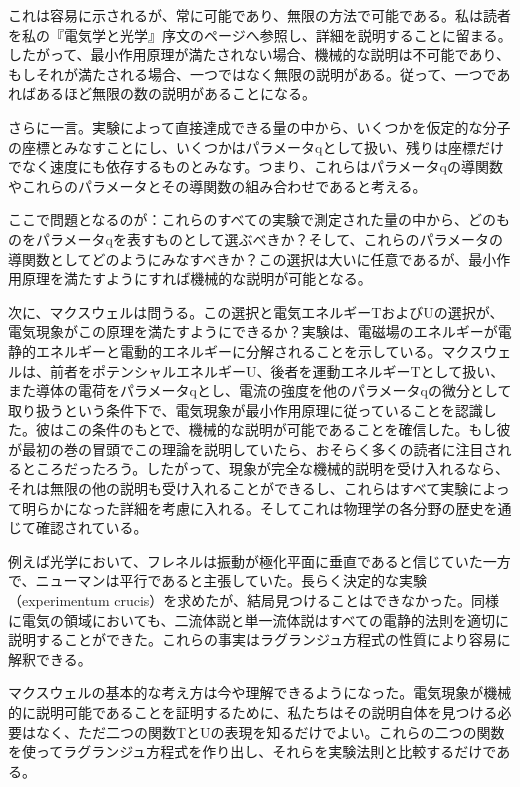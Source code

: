 \documentclass[a4paper,11pt,openany]{ltjsbook}
\begin{document}
これは容易に示されるが、常に可能であり、無限の方法で可能である。私は読者を私の『電気学と光学』序文のページへ参照し、詳細を説明することに留まる。したがって、最小作用原理が満たされない場合、機械的な説明は不可能であり、もしそれが満たされる場合、一つではなく無限の説明がある。従って、一つであればあるほど無限の数の説明があることになる。

さらに一言。実験によって直接達成できる量の中から、いくつかを仮定的な分子の座標とみなすことにし、いくつかはパラメータqとして扱い、残りは座標だけでなく速度にも依存するものとみなす。つまり、これらはパラメータqの導関数やこれらのパラメータとその導関数の組み合わせであると考える。

ここで問題となるのが：これらのすべての実験で測定された量の中から、どのものをパラメータqを表すものとして選ぶべきか？そして、これらのパラメータの導関数としてどのようにみなすべきか？この選択は大いに任意であるが、最小作用原理を満たすようにすれば機械的な説明が可能となる。

次に、マクスウェルは問うる。この選択と電気エネルギーTおよびUの選択が、電気現象がこの原理を満たすようにできるか？実験は、電磁場のエネルギーが電静的エネルギーと電動的エネルギーに分解されることを示している。マクスウェルは、前者をポテンシャルエネルギーU、後者を運動エネルギーTとして扱い、また導体の電荷をパラメータqとし、電流の強度を他のパラメータqの微分として取り扱うという条件下で、電気現象が最小作用原理に従っていることを認識した。彼はこの条件のもとで、機械的な説明が可能であることを確信した。もし彼が最初の巻の冒頭でこの理論を説明していたら、おそらく多くの読者に注目されるところだったろう。したがって、現象が完全な機械的説明を受け入れるなら、それは無限の他の説明も受け入れることができるし、これらはすべて実験によって明らかになった詳細を考慮に入れる。そしてこれは物理学の各分野の歴史を通じて確認されている。

例えば光学において、フレネルは振動が極化平面に垂直であると信じていた一方で、ニューマンは平行であると主張していた。長らく決定的な実験（experimentum crucis）を求めたが、結局見つけることはできなかった。同様に電気の領域においても、二流体説と単一流体説はすべての電静的法則を適切に説明することができた。これらの事実はラグランジュ方程式の性質により容易に解釈できる。

マクスウェルの基本的な考え方は今や理解できるようになった。電気現象が機械的に説明可能であることを証明するために、私たちはその説明自体を見つける必要はなく、ただ二つの関数TとUの表現を知るだけでよい。これらの二つの関数を使ってラグランジュ方程式を作り出し、それらを実験法則と比較するだけである。
\end{document}
